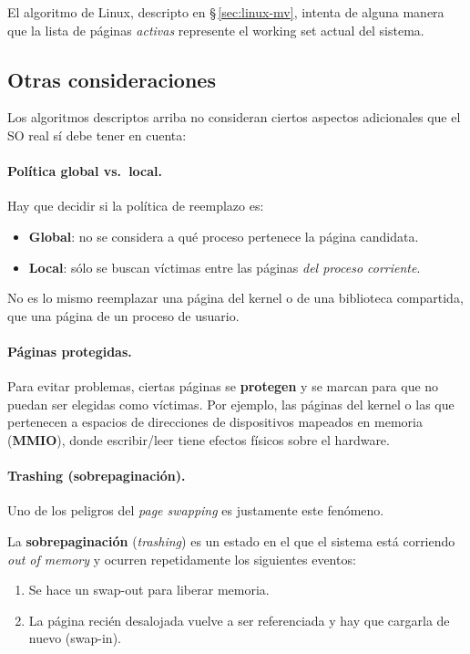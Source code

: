 \documentclass[11pt,a4paper]{article}
\begin{document}
El algoritmo de Linux, descripto en \S\,\ref{sec:linux-mv}, intenta de
alguna manera que la lista de páginas \emph{activas} represente el
working set actual del sistema.

\subsection{Otras consideraciones}

Los algoritmos descriptos arriba no consideran ciertos aspectos
adicionales que el SO real sí debe tener en cuenta:

\paragraph{Política global vs.\ local.}
Hay que decidir si la política de reemplazo es:

\begin{itemize}[leftmargin=*,nosep]
    \item \textbf{Global}: no se considera a qué proceso pertenece la
        página candidata.
    \item \textbf{Local}: sólo se buscan víctimas entre las páginas
        \emph{del proceso corriente}.
\end{itemize}

No es lo mismo reemplazar una página del kernel o de una biblioteca
compartida, que una página de un proceso de usuario.

\paragraph{Páginas protegidas.}
Para evitar problemas, ciertas páginas se \textbf{protegen} y se marcan
para que no puedan ser elegidas como víctimas. Por ejemplo, las páginas
del kernel o las que pertenecen a espacios de direcciones de dispositivos
mapeados en memoria (\textbf{MMIO}), donde escribir/leer tiene efectos
físicos sobre el hardware.

\paragraph{Trashing (sobrepaginación).}
Uno de los peligros del \emph{page swapping} es justamente este
fenómeno.

\begin{importante}
La \textbf{sobrepaginación} (\emph{trashing}) es un estado en el que el
sistema está corriendo \emph{out of memory} y ocurren repetidamente
los siguientes eventos:
\begin{enumerate}[leftmargin=*,nosep]
    \item Se hace un swap-out para liberar memoria.
    \item La página recién desalojada vuelve a ser referenciada y hay
        que cargarla de nuevo (swap-in).
\end{enumerate}
\end{importante}
\end{document}
